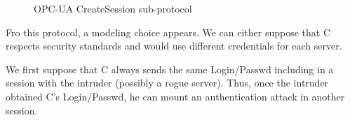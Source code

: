 \begin{figure}[htb]
    \renewcommand{\smname}{\smse}
    \caption{OPC-UA CreateSession sub-protocol}
\end{figure}

Fro this protocol, a modeling choice appears.
We can either suppose that C respects security standards and would use different credentials for each server.

We first suppose that C always sends the same Login/Passwd including in a session with the intruder (possibly a rogue server).
Thus, once the intruder obtained C's Login/Passwd, he can mount an authentication attack in another session.

